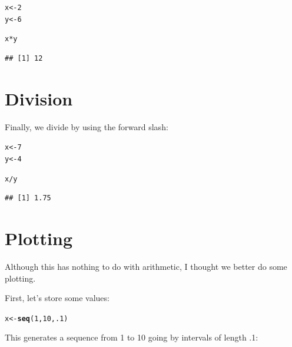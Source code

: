 \documentclass{article}\usepackage[]{graphicx}\usepackage[]{color}
\makeatletter
\newcommand{\hlnum}[1]{\textcolor[rgb]{0.686,0.059,0.569}{#1}}%
\newcommand{\hlopt}[1]{\textcolor[rgb]{0,0,0}{#1}}%
\newcommand{\hlstd}[1]{\textcolor[rgb]{0.345,0.345,0.345}{#1}}%
\newcommand{\hlkwb}[1]{\textcolor[rgb]{0.69,0.353,0.396}{#1}}%
\newcommand{\hlkwd}[1]{\textcolor[rgb]{0.737,0.353,0.396}{\textbf{#1}}}%
\newenvironment{kframe}{%
 \def\at@end@of@kframe{}%
 \ifinner\ifhmode%
  \def\at@end@of@kframe{\end{minipage}}%
  \begin{minipage}{\columnwidth}%
 \fi\fi%
 \def\FrameCommand##1{\hskip\@totalleftmargin \hskip-\fboxsep
 \colorbox{shadecolor}{##1}\hskip-\fboxsep
     \hskip-\linewidth \hskip-\@totalleftmargin \hskip\columnwidth}%
 \MakeFramed {\advance\hsize-\width
   \@totalleftmargin\z@ \linewidth\hsize
   \@setminipage}}%
 {\par\unskip\endMakeFramed%
 \at@end@of@kframe}
\newenvironment{knitrout}{}{} %
\makeatother
\begin{document}
\begin{knitrout}
\color{fgcolor}\begin{kframe}
\begin{alltt}
\hlstd{x}\hlkwb{<-}\hlnum{2}
\hlstd{y}\hlkwb{<-}\hlnum{6}

\hlstd{x}\hlopt{*}\hlstd{y}
\end{alltt}
\begin{verbatim}
## [1] 12
\end{verbatim}
\end{kframe}
\end{knitrout}

\section{Division}
Finally, we divide by using the forward slash:

\begin{knitrout}
\color{fgcolor}\begin{kframe}
\begin{alltt}
\hlstd{x}\hlkwb{<-}\hlnum{7}
\hlstd{y}\hlkwb{<-}\hlnum{4}

\hlstd{x}\hlopt{/}\hlstd{y}
\end{alltt}
\begin{verbatim}
## [1] 1.75
\end{verbatim}
\end{kframe}
\end{knitrout}

\section{Plotting}
Although this has nothing to do with arithmetic, I thought we better do some plotting.

First, let's store some values:

\begin{knitrout}
\color{fgcolor}\begin{kframe}
\begin{alltt}
\hlstd{x}\hlkwb{<-}\hlkwd{seq}\hlstd{(}\hlnum{1}\hlstd{,}\hlnum{10}\hlstd{,}\hlnum{.1}\hlstd{)}
\end{alltt}
\end{kframe}
\end{knitrout}

\noindent This generates a sequence from 1 to 10 going by intervals of length .1:
\end{document}
